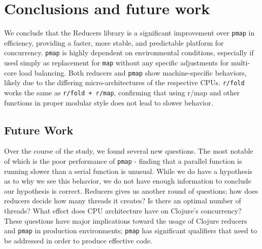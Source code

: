\documentclass[12pt]{article}
\newcommand{\clocode}[1]{{\texttt {#1}}}
\begin{document}

\section{Conclusions and future work}\label{sec:conclusion}

We conclude that the Reducers library is a significant improvement over \clocode{pmap} in efficiency, providing a faster, more stable, and predictable platform for concurrency. \clocode{pmap} is highly dependent on environmental conditions, especially if used simply as replacement for \clocode{map} without any specific adjustments for multi-core load balancing. 
Both reducers and \clocode{pmap} show machine-specific behaviors, likely due to the differing micro-architectures of the respective CPUs. \clocode{r/fold} works the same as \clocode{r/fold + r/map}, confirming that using r/map and other functions in proper modular style does not lead to slower behavior.

\subsection{Future Work}\label{sec:future}
Over the course of the study, we found several new questions. The most notable of which is the poor performance of \clocode{pmap} - finding that a parallel function is running slower than a serial function is unusual. While we do have a hypothesis as to why we see this behavior, we do not have enough information to conclude our hypothesis is correct. Reducers gives us another round of questions; how does reducers decide how many threads it creates? Is there an optimal number of threads? What effect does CPU architecture have on Clojure's concurrency?	
These questions have major implications toward the usage of Clojure reducers and \clocode{pmap} in production environments; \clocode{pmap} has significant qualifiers that need to be addressed in order to produce effective code.
\end{document}
